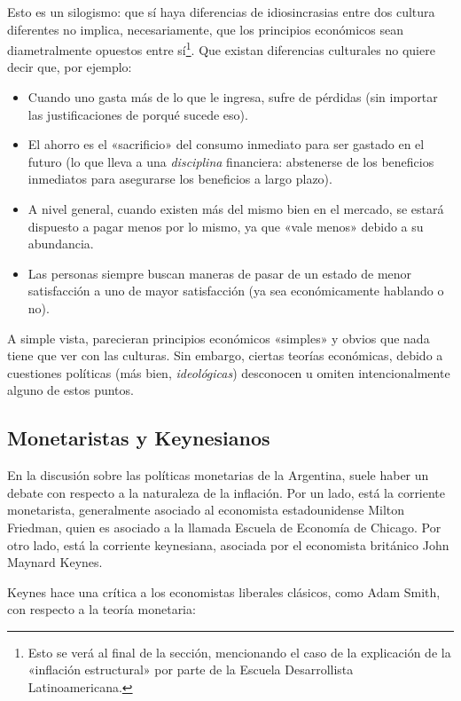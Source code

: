 \documentclass[12pt,a4paper,twoside]{book}
\begin{document}
Esto es un silogismo: que sí haya diferencias de idiosincrasias entre dos cultura diferentes no implica, necesariamente, que los principios económicos sean diametralmente opuestos entre sí\footnote{Esto se verá al final de la sección, mencionando el caso de la explicación de la «inflación estructural» por parte de la Escuela Desarrollista Latinoamericana.}. Que existan diferencias culturales no quiere decir que, por ejemplo:

\begin{itemize}
\item Cuando uno gasta más de lo que le ingresa, sufre de pérdidas (sin importar las justificaciones de porqué sucede eso).
\item El ahorro es el «sacrificio» del consumo inmediato para ser gastado en el futuro (lo que lleva a una \textit{disciplina} financiera: abstenerse de los beneficios inmediatos para asegurarse los beneficios a largo plazo).
\item A nivel general, cuando existen más del mismo bien en el mercado, se estará dispuesto a pagar menos por lo mismo, ya que «vale menos» debido a su abundancia.
\item Las personas siempre buscan maneras de pasar de un estado de menor satisfacción a uno de mayor satisfacción (ya sea económicamente hablando o no).
\end{itemize}

A simple vista, parecieran principios económicos «simples» y obvios que nada tiene que ver con las culturas. Sin embargo, ciertas teorías económicas, debido a cuestiones políticas (más bien, \textit{ideológicas}) desconocen u omiten intencionalmente alguno de estos puntos.

\subsection{Monetaristas y Keynesianos}
En la discusión sobre las políticas monetarias de la Argentina, suele haber un debate con respecto a la naturaleza de la inflación. Por un lado, está la corriente monetarista, generalmente asociado al economista estadounidense Milton Friedman, quien es asociado a la llamada Escuela de Economía de Chicago. Por otro lado, está la corriente keynesiana, asociada por el economista británico John Maynard Keynes.

Keynes hace una crítica a los economistas liberales clásicos, como Adam Smith, con respecto a la teoría monetaria:
\end{document}

